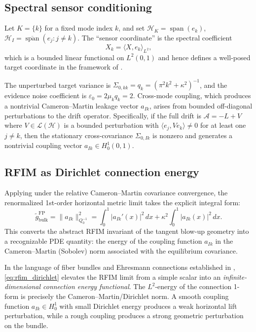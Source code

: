 \documentclass[11pt]{amsart}
\theoremstyle{plain}
\theoremstyle{definition}
\theoremstyle{remark}
\begin{document}
\subsection{Spectral sensor conditioning}
\label{sec:spde:conditioning}

Let $K = \{k\}$ for a fixed mode index $k$, and set $\mathcal{H}_K = \operatorname{span}(e_k)$, $\mathcal{H}_I = \overline{\operatorname{span}}(e_j : j \neq k)$. The ``sensor coordinate'' is the spectral coefficient
\[
  X_k = \langle X, e_k \rangle_{L^2},
\]
which is a bounded linear functional on $L^2(0,1)$ and hence defines a well-posed target coordinate in the framework of .

The unperturbed target variance is $\Sigma_{0,kk} = q_k = (\pi^2 k^2 + \kappa^2)^{-1}$, and the evidence noise coefficient is $\varepsilon_0 = 2\mu_k q_k = 2$. Cross-mode coupling, which produces a nontrivial Cameron--Martin leakage vector $a_{Ik}$, arises from bounded off-diagonal perturbations to the drift operator. Specifically, if the full drift is $\mathcal{A} = -L + V$ where $V \in \mathcal{L}(\mathcal{H})$ is a bounded perturbation with $\langle e_j, V e_k \rangle \neq 0$ for at least one $j \neq k$, then the stationary cross-covariance $\Sigma_{0,Ik}$ is nonzero and generates a nontrivial coupling vector $a_{Ik} \in H_0^1(0,1)$.

\subsection{RFIM as Dirichlet connection energy}

Applying  under the relative Cameron--Martin covariance convergence, the renormalized 1st-order horizontal metric limit takes the explicit integral form:
\begin{equation}
\label{eq:rfim_dirichlet}
  \boxed{
  \widetilde{g}_{\mathrm{bulk}}^{\mathrm{FP}}
  = \|a_{Ik}\|_{Q_0^{-1}}^2
  = \int_0^1 |a_{Ik}'(x)|^2\,dx + \kappa^2 \int_0^1 |a_{Ik}(x)|^2\,dx.
  }
\end{equation}
This converts the abstract RFIM invariant of the tangent blow-up geometry into a recognizable PDE quantity: the energy of the coupling function $a_{Ik}$ in the Cameron--Martin (Sobolev) norm associated with the equilibrium covariance.

In the language of fiber bundles and Ehresmann connections established in , \eqref{eq:rfim_dirichlet} elevates the RFIM limit from a simple scalar into an \emph{infinite-dimensional connection energy functional}. The $L^2$-energy of the connection 1-form is precisely the Cameron--Martin/Dirichlet norm. A smooth coupling function $a_{Ik} \in H_0^1$ with small Dirichlet energy produces a weak horizontal lift perturbation, while a rough coupling produces a strong geometric perturbation on the bundle.
\end{document}
